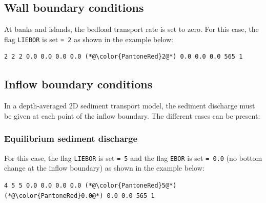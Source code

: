 \subsection{Wall boundary conditions}
At banks and islands, the bedload transport rate is set to zero. For this case, the flag \texttt{LIEBOR} is set \texttt{= 2} as shown in the example below:

\begin{lstlisting}[frame=trBL]
2 2 2 0.0 0.0 0.0 0.0 (*@\color{PantoneRed}2@*) 0.0 0.0 0.0 565 1
\end{lstlisting}

\subsection{Inflow boundary conditions}
In a depth-averaged 2D sediment transport model, the sediment discharge must be given at each point of the inflow boundary. The different cases can be present:
\subsubsection{Equilibrium sediment discharge}
For this case, the flag \texttt{LIEBOR} is set \texttt{= 5} and the flag \texttt{EBOR} is set \texttt{= 0.0} (no bottom change at the inflow boundary) as shown in the example below:

\begin{lstlisting}[frame=trBL]
4 5 5 0.0 0.0 0.0 0.0 (*@\color{PantoneRed}5@*) (*@\color{PantoneRed}0.0@*) 0.0 0.0 565 1
\end{lstlisting}

